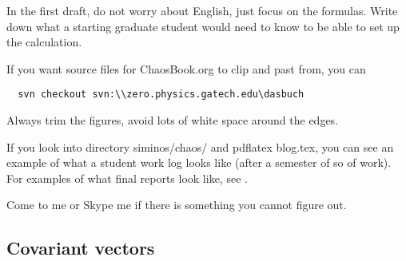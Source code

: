 \begin{description}
In the first draft, do not worry about
English, just focus on the formulas. Write
down what a starting graduate student would need to know to be able
to set up the calculation.

If you want source files for ChaosBook.org to clip and past from, you can
\begin{verbatim}
  svn checkout svn:\\zero.physics.gatech.edu\dasbuch
\end{verbatim}

Always trim the figures, avoid lots of white
space around the edges.

If you look into directory
siminos/chaos/ and pdflatex blog.tex, you can see an example of what
a student work log looks like (after a semester of so of work).
For examples of
what final reports look like, see .


Come to me or Skype me if there is something you
cannot figure out.

\end{description}


\subsection{Covariant vectors}

